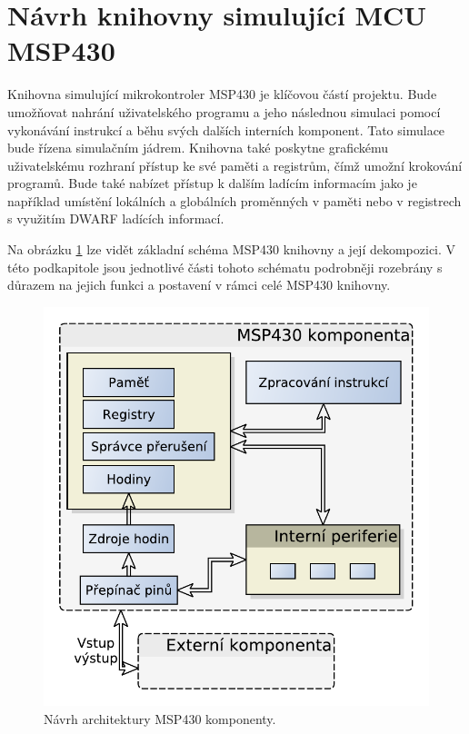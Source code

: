 
\section{Návrh knihovny simulující MCU MSP430}

Knihovna simulující mikrokontroler MSP430 je klíčovou částí projektu. Bude umožňovat nahrání uživatelského programu a jeho
následnou simulaci pomocí vykonávání instrukcí a běhu svých dalších interních komponent. Tato simulace bude řízena simulačním jádrem. Knihovna také poskytne grafickému uživatelskému rozhraní přístup ke své paměti a registrům, čímž umožní krokování programů. Bude také nabízet přístup k dalším ladícím informacím jako je například umístění lokálních a globálních proměnných v paměti nebo v registrech s využitím DWARF ladících informací.

Na obrázku \ref{fig:msp430_arch} lze vidět základní schéma MSP430 knihovny a její dekompozici. V této podkapitole jsou jednotlivé části tohoto schématu podrobněji rozebrány s důrazem na jejich funkci a postavení v rámci celé MSP430 knihovny.

\begin{figure}[ht]
\centering
\includegraphics[trim=0cm 0cm 0cm 0cm, scale=0.7]{fig/msp430_arch}
\caption{Návrh architektury MSP430 komponenty.}
\label{fig:msp430_arch}
\end{figure}

